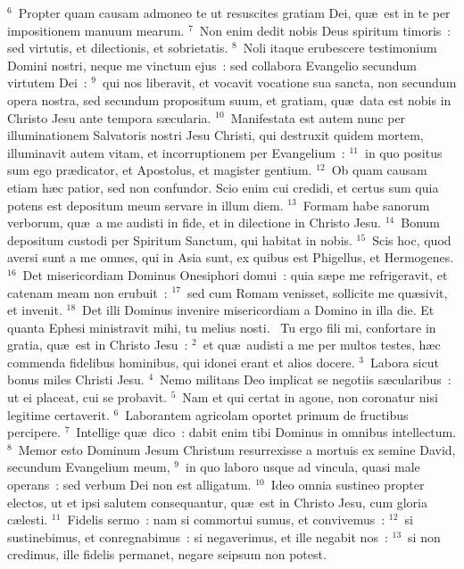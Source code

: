 ${}^{6}$~Propter quam causam admoneo te ut resuscites gratiam Dei, qu\ae\ est in te per impositionem manuum mearum.
${}^{7}$~Non enim dedit nobis Deus spiritum timoris~: sed virtutis, et dilectionis, et sobrietatis.
${}^{8}$~Noli itaque erubescere testimonium Domini nostri, neque me vinctum ejus~: sed collabora Evangelio secundum virtutem Dei~:
${}^{9}$~qui nos liberavit, et vocavit vocatione sua sancta, non secundum opera nostra, sed secundum propositum suum, et gratiam, qu\ae\ data est nobis in Christo Jesu ante tempora s\ae cularia.
${}^{10}$~Manifestata est autem nunc per illuminationem Salvatoris nostri Jesu Christi, qui destruxit quidem mortem, illuminavit autem vitam, et incorruptionem per Evangelium~:
${}^{11}$~in quo positus sum ego pr\ae dicator, et Apostolus, et magister gentium.
${}^{12}$~Ob quam causam etiam h\ae c patior, sed non confundor. Scio enim cui credidi, et certus sum quia potens est depositum meum servare in illum diem.
${}^{13}$~Formam habe sanorum verborum, qu\ae\ a me audisti in fide, et in dilectione in Christo Jesu.
${}^{14}$~Bonum depositum custodi per Spiritum Sanctum, qui habitat in nobis.
${}^{15}$~Scis hoc, quod aversi sunt a me omnes, qui in Asia sunt, ex quibus est Phigellus, et Hermogenes.
${}^{16}$~Det misericordiam Dominus Onesiphori domui~: quia s\ae pe me refrigeravit, et catenam meam non erubuit~:
${}^{17}$~sed cum Romam venisset, sollicite me qu\ae sivit, et invenit.
${}^{18}$~Det illi Dominus invenire misericordiam a Domino in illa die. Et quanta Ephesi ministravit mihi, tu melius nosti.
~Tu ergo fili mi, confortare in gratia, qu\ae\ est in Christo Jesu~:
${}^{2}$~et qu\ae\ audisti a me per multos testes, h\ae c commenda fidelibus hominibus, qui idonei erant et alios docere.
${}^{3}$~Labora sicut bonus miles Christi Jesu.
${}^{4}$~Nemo militans Deo implicat se negotiis s\ae cularibus~: ut ei placeat, cui se probavit.
${}^{5}$~Nam et qui certat in agone, non coronatur nisi legitime certaverit.
${}^{6}$~Laborantem agricolam oportet primum de fructibus percipere.
${}^{7}$~Intellige qu\ae\ dico~: dabit enim tibi Dominus in omnibus intellectum.
${}^{8}$~Memor esto Dominum Jesum Christum resurrexisse a mortuis ex semine David, secundum Evangelium meum,
${}^{9}$~in quo laboro usque ad vincula, quasi male operans~: sed verbum Dei non est alligatum.
${}^{10}$~Ideo omnia sustineo propter electos, ut et ipsi salutem consequantur, qu\ae\ est in Christo Jesu, cum gloria c\ae lesti.
${}^{11}$~Fidelis sermo~: nam si commortui sumus, et convivemus~:
${}^{12}$~si sustinebimus, et conregnabimus~: si negaverimus, et ille negabit nos~:
${}^{13}$~si non credimus, ille fidelis permanet, negare seipsum non potest.



